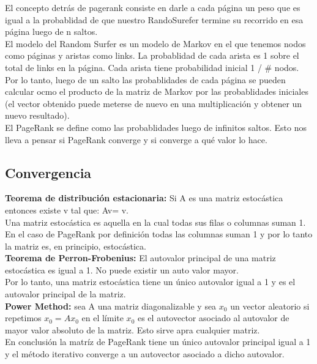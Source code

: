 \documentclass[titlepage,a4paper]{article}
\begin{document}
El concepto detrás de pagerank consiste en darle a cada página un peso que es igual a la probablidad de que nuestro RandoSurefer termine su recorrido en esa página luego de n saltos. \\

El modelo del Random Surfer es un modelo de Markov en el que tenemos nodos como páginas y aristas como links. La probablidad de cada arista es 1 sobre el total de links en la página. Cada arista tiene probabilidad inicial 1 / \# nodos. Por lo tanto, luego de un salto las probablidades de cada página se pueden calcular ocmo el producto de la matriz de Markov por las probablidades iniciales (el vector obtenido puede meterse de nuevo en una multiplicación y obtener un nuevo resultado).\\

El PageRank se define como las probablidades luego de infinitos saltos. Esto nos lleva a pensar si PageRank converge y si converge a qué valor lo hace. 

\subsection*{Convergencia}
\textbf{Teorema de distribución estacionaria:} Si A es una matriz estocástica entonces existe v tal que: Av= v. \\

Una matriz estocástica es aquella en la cual todas sus filas o columnas suman 1. En el caso de PageRank por definición todas las columnas suman 1 y por lo tanto la matriz es, en principio, estocástica. \\

\textbf{Teorema de Perron-Frobenius: }El autovalor principal de una matriz estocástica es igual a 1. No puede existir un auto valor mayor. \\

Por lo tanto, una matriz estocástica tiene un único autovalor igual a 1 y es el autovalor principal de la matriz. \\

\textbf{Power Method: }sea A una matriz diagonalizable y sea $x_0$ un vector aleatorio si repetimos $x_0 = Ax_0$ en el límite $x_0$ es el autovector asociado al autovalor de mayor valor absoluto de la matriz. Esto sirve apra cualquier matriz. \\

En conclusión la matríz de PageRank tiene un único autovalor principal igual a 1 y el método iterativo converge a un autovector asociado a dicho autovalor. \\
\end{document}
